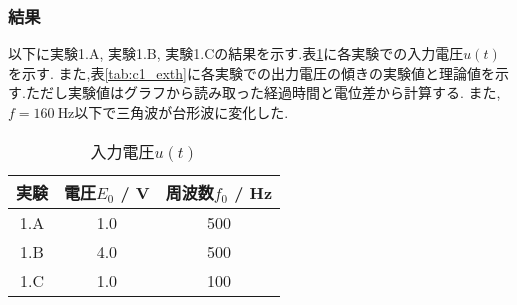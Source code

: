 \subsubsection{結果}
以下に実験1.A, 実験1.B, 実験1.Cの結果を示す.表\ref{tab:c1_inout}に各実験での入力電圧$u(t)$を示す.
また,表\ref{tab:c1_exth}に各実験での出力電圧の傾きの実験値と理論値を示す.ただし実験値はグラフから読み取った経過時間と電位差から計算する.
また,$f=160~\si{\hertz}$以下で三角波が台形波に変化した.
\begin{figure}[htbp]
  \begin{minipage}{0.5\hsize}
  \end{minipage}
  \begin{minipage}{0.5\hsize}
  \end{minipage} 
\end{figure}
\begin{figure}[htbp]
  \begin{minipage}{0.5\hsize}
  \end{minipage}
  \begin{minipage}{0.5\hsize}
  \end{minipage} 
\end{figure}
\begin{figure}[htbp]
  \begin{minipage}{0.5\hsize}
  \end{minipage}
  \begin{minipage}{0.5\hsize}
  \end{minipage} 
\end{figure}
\newpage
\begin{table}[h]
  \caption{入力電圧$u(t)$}
  \label{tab:c1_inout}
  \centering
  \begin{tabular}{ccc}
    \hline
    実験&電圧$E_0$ / \si{\volt}&周波数$f_0$ / \si{\hertz}\\
    \hline \hline
    1.A&1.0&500\\
    1.B&4.0&500\\
    1.C&1.0&100\\
    \hline
  \end{tabular}
\end{table}
